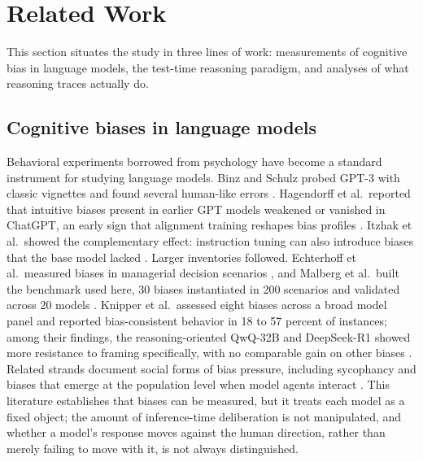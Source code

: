 \documentclass[conference]{IEEEtran}
\begin{document}
\section{Related Work}

This section situates the study in three lines of work: measurements of cognitive bias in language models, the test-time reasoning paradigm, and analyses of what reasoning traces actually do.

\subsection{Cognitive biases in language models}
Behavioral experiments borrowed from psychology have become a standard instrument for studying language models. Binz and Schulz probed GPT-3 with classic vignettes and found several human-like errors \cite{binz2023using}. Hagendorff et al.\ reported that intuitive biases present in earlier GPT models weakened or vanished in ChatGPT, an early sign that alignment training reshapes bias profiles \cite{hagendorff2023human}. Itzhak et al.\ showed the complementary effect: instruction tuning can also introduce biases that the base model lacked \cite{itzhak2024instructed}. Larger inventories followed. Echterhoff et al.\ measured biases in managerial decision scenarios \cite{echterhoff2024cognitive}, and Malberg et al.\ built the benchmark used here, 30 biases instantiated in 200 scenarios and validated across 20 models \cite{malberg2024comprehensive}. Knipper et al.\ assessed eight biases across a broad model panel and reported bias-consistent behavior in 18 to 57 percent of instances; among their findings, the reasoning-oriented QwQ-32B and DeepSeek-R1 showed more resistance to framing specifically, with no comparable gain on other biases \cite{knipper2025bias}. Related strands document social forms of bias pressure, including sycophancy \cite{sharma2024towards, fanous2025syceval} and biases that emerge at the population level when model agents interact \cite{ashery2025emergent}. This literature establishes that biases can be measured, but it treats each model as a fixed object; the amount of inference-time deliberation is not manipulated, and whether a model's response moves against the human direction, rather than merely failing to move with it, is not always distinguished.
\end{document}
